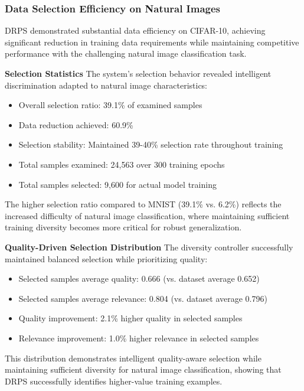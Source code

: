 \documentclass[12pt]{article}
\begin{document}
\subsubsection{Data Selection Efficiency on Natural Images}\label{selection-efficiency}

DRPS demonstrated substantial data efficiency on CIFAR-10, achieving significant reduction in training data requirements while maintaining competitive performance with the challenging natural image classification task.

\textbf{Selection Statistics}
The system's selection behavior revealed intelligent discrimination adapted to natural image characteristics:
\begin{itemize}
\item Overall selection ratio: 39.1\% of examined samples
\item Data reduction achieved: 60.9\%
\item Selection stability: Maintained 39-40\% selection rate throughout training
\item Total samples examined: 24,563 over 300 training epochs
\item Total samples selected: 9,600 for actual model training
\end{itemize}

The higher selection ratio compared to MNIST (39.1\% vs. 6.2\%) reflects the increased difficulty of natural image classification, where maintaining sufficient training diversity becomes more critical for robust generalization.

\textbf{Quality-Driven Selection Distribution}
The diversity controller successfully maintained balanced selection while prioritizing quality:
\begin{itemize}
\item Selected samples average quality: 0.666 (vs. dataset average 0.652)
\item Selected samples average relevance: 0.804 (vs. dataset average 0.796)
\item Quality improvement: 2.1\% higher quality in selected samples
\item Relevance improvement: 1.0\% higher relevance in selected samples
\end{itemize}

This distribution demonstrates intelligent quality-aware selection while maintaining sufficient diversity for natural image classification, showing that DRPS successfully identifies higher-value training examples.
\end{document}
